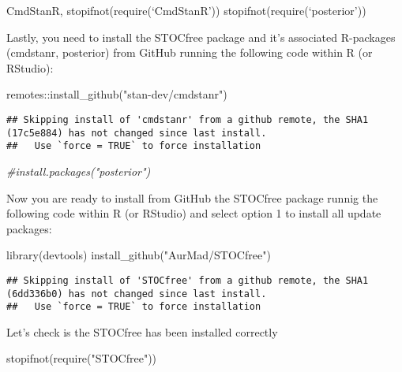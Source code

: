 \documentclass[
  12pt,
]{article}
\newenvironment{Shaded}{\begin{snugshade}}{\end{snugshade}}
\newcommand{\CommentTok}[1]{\textcolor[rgb]{0.56,0.35,0.01}{\textit{#1}}}
\newcommand{\FunctionTok}[1]{\textcolor[rgb]{0.00,0.00,0.00}{#1}}
\newcommand{\NormalTok}[1]{#1}
\newcommand{\SpecialCharTok}[1]{\textcolor[rgb]{0.00,0.00,0.00}{#1}}
\newcommand{\StringTok}[1]{\textcolor[rgb]{0.31,0.60,0.02}{#1}}
\begin{document}
CmdStanR, stopifnot(require(`CmdStanR')) stopifnot(require(`posterior'))

Lastly, you need to install the STOCfree package and it's associated
R-packages (cmdstanr, posterior) from GitHub running the following code
within R (or RStudio):

\begin{Shaded}
\begin{Highlighting}[]
\NormalTok{remotes}\SpecialCharTok{::}\FunctionTok{install\_github}\NormalTok{(}\StringTok{"stan{-}dev/cmdstanr"}\NormalTok{)}
\end{Highlighting}
\end{Shaded}

\begin{verbatim}
## Skipping install of 'cmdstanr' from a github remote, the SHA1 (17c5e884) has not changed since last install.
##   Use `force = TRUE` to force installation
\end{verbatim}

\begin{Shaded}
\begin{Highlighting}[]
\CommentTok{\#install.packages("posterior")}
\end{Highlighting}
\end{Shaded}

Now you are ready to install from GitHub the STOCfree package runnig the
following code within R (or RStudio) and select option 1 to install all
update packages:

\begin{Shaded}
\begin{Highlighting}[]
\FunctionTok{library}\NormalTok{(devtools)}
\FunctionTok{install\_github}\NormalTok{(}\StringTok{"AurMad/STOCfree"}\NormalTok{)}
\end{Highlighting}
\end{Shaded}

\begin{verbatim}
## Skipping install of 'STOCfree' from a github remote, the SHA1 (6dd336b0) has not changed since last install.
##   Use `force = TRUE` to force installation
\end{verbatim}

Let's check is the STOCfree has been installed correctly

\begin{Shaded}
\begin{Highlighting}[]
\FunctionTok{stopifnot}\NormalTok{(}\FunctionTok{require}\NormalTok{(}\StringTok{"STOCfree"}\NormalTok{))}
\end{Highlighting}
\end{Shaded}
\end{document}
